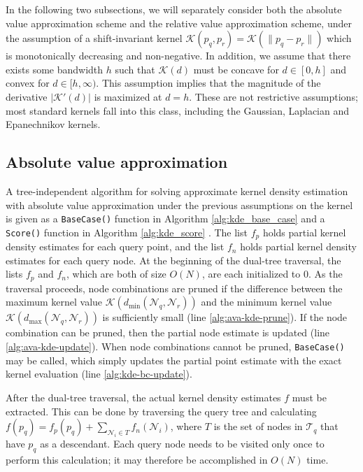 In the following two subsections, we will separately consider both the absolute
value approximation scheme and the relative value approximation scheme, under
the assumption of a shift-invariant kernel $\mathcal{K}(p_q, p_r) =
\mathcal{K}(\| p_q - p_r \|)$ which is monotonically decreasing and
non-negative.  In addition, we assume that there exists some bandwidth $h$ such
that $\mathcal{K}(d)$ must be concave for $d \in [0, h]$ and convex for $d \in
[h, \infty)$.  This assumption implies that the magnitude of the derivative
$|\mathcal{K}'(d)|$ is maximized at $d = h$.  These are not restrictive
assumptions; most standard kernels fall into this class, including the Gaussian,
Laplacian and Epanechnikov kernels.

\subsection{Absolute value approximation}

A tree-independent algorithm for solving approximate kernel density estimation
with absolute value approximation under the previous assumptions on the kernel
is given as a \texttt{BaseCase()} function in Algorithm \ref{alg:kde_base_case}
and a \texttt{Score()} function in Algorithm \ref{alg:kde_score}  \citep[a
correctness proof can be found in][]{curtin2013tree}.  The list $f_p$ holds
partial kernel density estimates for each query point, and the list $f_n$ holds
partial kernel density estimates for each query node.  At the beginning of the
dual-tree traversal, the lists $f_p$ and $f_n$, which are both of size $O(N)$,
are each initialized to 0.  As the traversal proceeds, node combinations are
pruned if the difference between the maximum kernel value
$\mathcal{K}(d_{\min}(\mathscr{N}_q, \mathscr{N}_r))$ and the minimum kernel
value $\mathcal{K}(d_{\max}(\mathscr{N}_q, \mathscr{N}_r))$ is sufficiently
small (line \ref{alg:ava-kde-prune}).  If the node combination can be pruned,
then the partial node estimate is updated (line \ref{alg:ava-kde-update}).  When
node combinations cannot be pruned, \texttt{BaseCase()} may be called, which
simply updates the partial point estimate with the exact kernel evaluation (line
\ref{alg:kde-bc-update}).

After the dual-tree traversal, the actual kernel density estimates $f$
must be extracted.  This can be done by traversing the query tree and
calculating $f(p_q) = f_p(p_q) + \sum_{\mathscr{N}_i \in T}
f_n(\mathscr{N}_i)$, where $T$ is the set of nodes in $\mathscr{T}_q$ that
have $p_q$ as a descendant.  %
Each query node needs to be visited only once to perform this calculation; it
may therefore be accomplished in $O(N)$ time.

